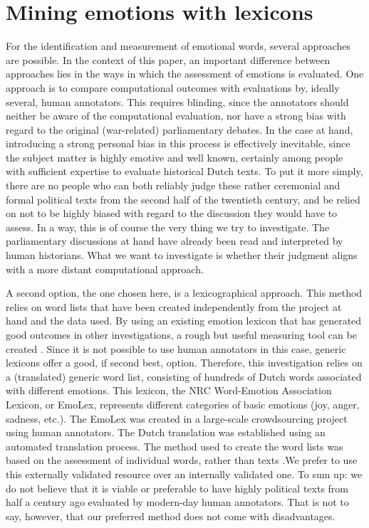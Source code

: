 \documentclass{dhbenelux}
\begin{document}
\section{Mining emotions with lexicons}
For the identification and measurement of emotional words, several approaches are possible. In the context of this paper, an important difference between approaches lies in the ways in which the assessment of emotions is evaluated. One approach is to compare computational outcomes with evaluations by, ideally several, human annotators. This requires blinding, since the annotators should neither be aware of the computational evaluation, nor have a strong bias with regard to the original (war-related) parliamentary debates. In the case at hand, introducing a strong personal bias in this process is effectively inevitable, since the subject matter is highly emotive and well known, certainly among people with sufficient expertise to evaluate historical Dutch texts. To put it more simply, there are no people who can both reliably judge these rather ceremonial and formal political texts from the second half of the twentieth century, and be relied on not to be highly biased with regard to the discussion they would have to assess. In a way, this is of course the very thing we try to investigate. The parliamentary discussions at hand have already been read and interpreted by human historians. What we want to investigate is whether their judgment aligns with a more distant computational approach.

A second option, the one chosen here, is a lexicographical approach. This method relies on word lists that have been created independently from the project at hand and the data used. By using an existing emotion lexicon that has generated good outcomes in other investigations, a rough but useful measuring tool can be created \citep{mohammad_crowdsourcing_2013, mohammad_once_2011, mohammad_once_2012, mohammad_practical_2020, mohammad_ten_2020}. Since it is not possible to use human annotators in this case, generic lexicons offer a good, if second best, option. Therefore, this investigation relies on a (translated) generic word list, consisting of hundreds of Dutch words associated with different emotions. This lexicon, the NRC Word-Emotion Association Lexicon, or EmoLex, represents different categories of basic emotions (joy, anger, sadness, etc.). The EmoLex was created in a large-scale crowdsourcing project using human annotators. The Dutch translation was established using an automated translation process. The method used to create the word lists was based on the assessment of individual words, rather than texts \citep{mohammad_crowdsourcing_2013}.We prefer to use this externally validated resource over an internally validated one. To sum up: we do not believe that it is viable or preferable to have highly political texts from half a century ago evaluated by modern-day human annotators. That is not to say, however, that our preferred method does not come with disadvantages.
\end{document}
